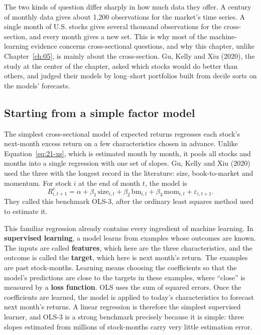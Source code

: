 The two kinds of question differ sharply in how much data they offer. A century of monthly data gives about 1,200 observations for the market's time series. A single month of U.S. stocks gives several thousand observations for the cross-section, and every month gives a new set. This is why most of the machine-learning evidence concerns cross-sectional questions, and why this chapter, unlike Chapter~\ref{ch:05}, is mainly about the cross-section. Gu, Kelly and Xiu (2020), the study at the center of the chapter, asked which stocks would do better than others, and judged their models by long--short portfolios built from decile sorts on the models' forecasts.

\subsection{Starting from a simple factor model}
\label{sec:21-simple}

The simplest cross-sectional model of expected returns regresses each stock's next-month excess return on a few characteristics chosen in advance. Unlike Equation~\eqref{eq:21-xs}, which is estimated month by month, it pools all stocks and months into a single regression with one set of slopes. Gu, Kelly and Xiu (2020) used the three with the longest record in the literature: size, book-to-market and momentum. For stock $i$ at the end of month $t$, the model is
\begin{equation}
  R^{e}_{i,t+1} = \alpha + \beta_1\,\text{size}_{i,t} + \beta_2\,\text{bm}_{i,t} + \beta_3\,\text{mom}_{i,t} + \varepsilon_{i,t+1}.
  \label{eq:21-ols3}
\end{equation}
They called this benchmark OLS-3, after the ordinary least squares method used to estimate it.

This familiar regression already contains every ingredient of machine learning. In \textbf{supervised learning}, a model learns from examples whose outcomes are known. The inputs are called \textbf{features}, which here are the three characteristics, and the outcome is called the \textbf{target}, which here is next month's return. The examples are past stock-months. Learning means choosing the coefficients so that the model's predictions are close to the targets in these examples, where ``close'' is measured by a \textbf{loss function}. OLS uses the sum of squared errors. Once the coefficients are learned, the model is applied to today's characteristics to forecast next month's returns. A linear regression is therefore the simplest supervised learner, and OLS-3 is a strong benchmark precisely because it is simple: three slopes estimated from millions of stock-months carry very little estimation error.

